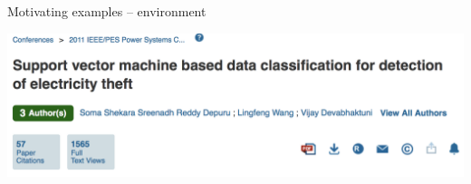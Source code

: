 \documentclass[mathserif, aspectratio=169]{beamer}
\begin{document}
\begin{frame}{Motivating examples -- environment}



\includegraphics[scale=0.4]{depuru_etal_SVMTheft}





\end{frame}
\end{document}
